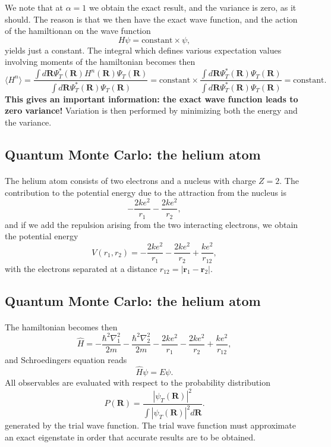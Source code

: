 \documentclass[%
twoside,                 %
final,                   %
10pt]{article}
\begin{document}
We note that at $\alpha=1$ we obtain the exact
result, and the variance is zero, as it should. The reason is that 
we then have the exact wave function, and the action of the hamiltionan
on the wave function
\[
   H\psi = \mathrm{constant}\times \psi,
\]
yields just a constant. The integral which defines various 
expectation values involving moments of the hamiltonian becomes then
\[
   \langle H^n \rangle =
   \frac{\int d\bm{R}\Psi^{\ast}_T(\bm{R})H^n(\bm{R})\Psi_T(\bm{R})}
        {\int d\bm{R}\Psi^{\ast}_T(\bm{R})\Psi_T(\bm{R})}=
\mathrm{constant}\times\frac{\int d\bm{R}\Psi^{\ast}_T(\bm{R})\Psi_T(\bm{R})}
        {\int d\bm{R}\Psi^{\ast}_T(\bm{R})\Psi_T(\bm{R})}=\mathrm{constant}.
\]
\textbf{This gives an important information: the exact wave function leads to zero variance!}
Variation is then performed by minimizing both the energy and the variance.





\subsection{Quantum Monte Carlo: the helium atom}

\paragraph{}
The helium atom consists of two electrons and a nucleus with
charge $Z=2$. 
The contribution  
to the potential energy due to the attraction from the nucleus is
\[
   -\frac{2ke^2}{r_1}-\frac{2ke^2}{r_2},
\] 
and if we add the repulsion arising from the two 
interacting electrons, we obtain the potential energy
\[
 V(r_1, r_2)=-\frac{2ke^2}{r_1}-\frac{2ke^2}{r_2}+
               \frac{ke^2}{r_{12}},
\]
with the electrons separated at a distance 
$r_{12}=|\bm{r}_1-\bm{r}_2|$.




\subsection{Quantum Monte Carlo: the helium atom}

\paragraph{}

The hamiltonian becomes then
\[
   \hat{H}=-\frac{\hbar^2\nabla_1^2}{2m}-\frac{\hbar^2\nabla_2^2}{2m}
          -\frac{2ke^2}{r_1}-\frac{2ke^2}{r_2}+
               \frac{ke^2}{r_{12}},
\]
and  Schroedingers equation reads
\[
   \hat{H}\psi=E\psi.
\]
All observables are evaluated with respect to the probability distribution
\[
   P(\bm{R})= \frac{\left|\psi_T(\bm{R})\right|^2}{\int \left|\psi_T(\bm{R})\right|^2d\bm{R}}.
\]
generated by the trial wave function.   
The trial wave function must approximate an exact 
eigenstate in order that accurate results are to be obtained.
\end{document}
